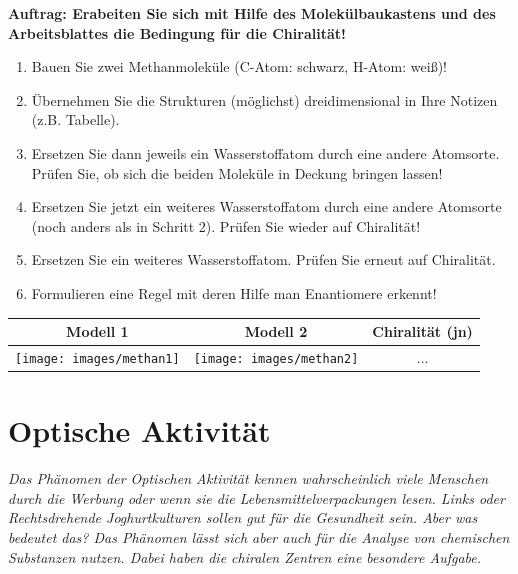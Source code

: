 \documentclass{scrartcl}  %
\begin{document}
\vspace{0.3cm}
			\noindent \textbf{Auftrag: Erabeiten Sie sich mit Hilfe des Molekülbaukastens und des Arbeitsblattes die Bedingung für die Chiralität!}
			\begin{enumerate}
    			\item Bauen Sie zwei Methanmoleküle (C-Atom: schwarz, H-Atom: weiß)!
    			\item Übernehmen Sie die Strukturen (möglichst) dreidimensional in Ihre Notizen (z.B. Tabelle).
    			\item Ersetzen Sie dann jeweils ein Wasserstoffatom durch eine andere Atomsorte. Prüfen Sie, ob sich die beiden Moleküle in Deckung bringen lassen!
    			\item Ersetzen Sie jetzt ein weiteres Wasserstoffatom durch eine andere Atomsorte (noch anders als in Schritt 2). Prüfen Sie wieder auf Chiralität!
    			\item Ersetzen Sie ein weiteres Wasserstoffatom. Prüfen Sie erneut auf Chiralität.
    			\item Formulieren eine Regel mit deren Hilfe man Enantiomere erkennt!
			\end{enumerate}

			\begin{tabular}{|c|c|c|}
				\hline
				Modell 1 & Modell 2 & Chiralität (j\/n) \\
				\hline
				\texttt{[image: images/methan1]} &
				\texttt{[image: images/methan2]} &
				... \\
				\hline
			\end{tabular}

\newpage
	\section{Optische Aktivität}
	
		\textit{Das Phänomen der Optischen Aktivität kennen wahrscheinlich viele Menschen durch die Werbung oder wenn sie die Lebensmittelverpackungen lesen. Links oder Rechtsdrehende Joghurtkulturen sollen gut für die Gesundheit sein. Aber was bedeutet das? Das Phänomen lässt sich aber auch für die Analyse von chemischen Substanzen nutzen. Dabei haben die chiralen Zentren eine besondere Aufgabe.} \newline
\end{document}
